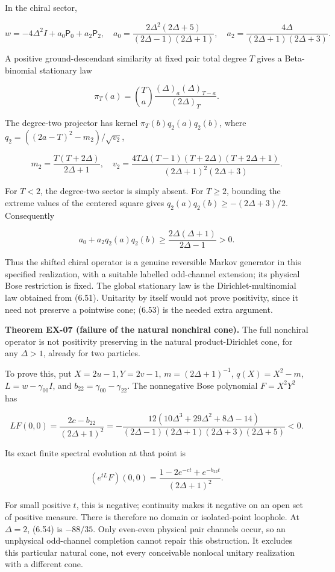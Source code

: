 In the chiral sector,

\[
w=-4\Delta^2I+a_0\mathsf P_0+a_2\mathsf P_2,
\quad
a_0=\frac{2\Delta^2(2\Delta+5)}{(2\Delta-1)(2\Delta+1)},\quad
a_2=\frac{4\Delta}{(2\Delta+1)(2\Delta+3)}.
\tag{6.50}
\]

A positive ground-descendant similarity at fixed pair total degree \(T\) gives a Beta-binomial stationary law

\[
\pi_T(a)=\binom Ta\frac{(\Delta)_a(\Delta)_{T-a}}{(2\Delta)_T}.
\tag{6.51}
\]

The degree-two projector has kernel \(\pi_T(b)q_2(a)q_2(b)\), where \(q_2=((2a-T)^2-m_2)/\sqrt{v_2}\),

\[
m_2=\frac{T(T+2\Delta)}{2\Delta+1},\quad
v_2=\frac{4T\Delta(T-1)(T+2\Delta)(T+2\Delta+1)}{(2\Delta+1)^2(2\Delta+3)}.
\tag{6.52}
\]

For \(T<2\), the degree-two sector is simply absent. For \(T\ge2\), bounding the extreme values of the centered square gives \(q_2(a)q_2(b)\ge-(2\Delta+3)/2\). Consequently

\[
a_0+a_2q_2(a)q_2(b)\ge\frac{2\Delta(\Delta+1)}{2\Delta-1}>0.
\tag{6.53}
\]

Thus the shifted chiral operator is a genuine reversible Markov generator in this specified realization, with a suitable labelled odd-channel extension; its physical Bose restriction is fixed. The global stationary law is the Dirichlet-multinomial law obtained from (6.51). Unitarity by itself would not prove positivity, since it need not preserve a pointwise cone; (6.53) is the needed extra argument.

\textbf{Theorem EX-07 (failure of the natural nonchiral cone).} The full nonchiral operator is not positivity preserving in the natural product-Dirichlet cone, for any \(\Delta>1\), already for two particles.

To prove this, put \(X=2u-1,Y=2v-1\), \(m=(2\Delta+1)^{-1}\), \(q(X)=X^2-m\), \(L=w-\gamma_{00}I\), and \(b_{22}=\gamma_{00}-\gamma_{22}\). The nonnegative Bose polynomial \(F=X^2Y^2\) has

\[
LF(0,0)=\frac{2c-b_{22}}{(2\Delta+1)^2}
=-\frac{12(10\Delta^3+29\Delta^2+8\Delta-14)}
{(2\Delta-1)(2\Delta+1)(2\Delta+3)(2\Delta+5)}<0.
\tag{6.54}
\]

Its exact finite spectral evolution at that point is

\[
(e^{tL}F)(0,0)=\frac{1-2e^{-ct}+e^{-b_{22}t}}{(2\Delta+1)^2}.
\tag{6.55}
\]

For small positive \(t\), this is negative; continuity makes it negative on an open set of positive measure. There is therefore no domain or isolated-point loophole. At \(\Delta=2\), (6.54) is \(-88/35\). Only even-even physical pair channels occur, so an unphysical odd-channel completion cannot repair this obstruction. It excludes this particular natural cone, not every conceivable nonlocal unitary realization with a different cone.


